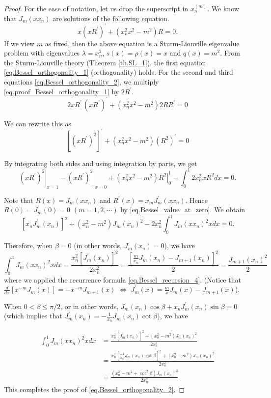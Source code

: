 \begin{proof} For the ease of notation, let us drop the superscript in $x_n^{(m)}$. We know that $J_m\left(x x_{n}\right)$ are solutions of the following equation. 
\begin{equation}\label{eq.proof_Bessel_orthogonality_1}
    x(x R^{\prime})^{\prime} + (x_n^2 x^2 - m^2) R = 0.
\end{equation}
If we view $m$ as fixed, then the above equation is a Sturm-Liouville eigenvalue problem with eigenvalues $\lambda=x_n^2$, $s(x) = \rho(x) = x$ and $q(x) = m^2$. From the Sturm-Liouville theory (Theorem \ref{th.SL_1}), the first equation \eqref{eq.Bessel_orthogonality_1} (orthogonality) holds. For the second and third equations \eqref{eq.Bessel_orthogonality_2}, we multiply \eqref{eq.proof_Bessel_orthogonality_1} by $2 R^{\prime}$.
$$
2 x R^{\prime}\, (x R^{\prime})^{\prime} +\left(x_n^2 x^2-m^2\right) 2 R R^{\prime}=0
$$

We can rewrite this as
$$
\left[\left(x R^{\prime}\right)^2\right]^{\prime}+\left(x_n^2 x^2-m^2\right)\left(R^2\right)^{\prime}=0
$$

By integrating both sides and using integration by parts, we get
$$
\left.\left(x R^{\prime}\right)^2\right|_{x=1}-\left.\left(x R^{\prime}\right)^2\right|_{x=0}+\left.\left(x_n^2 x^2-m^2\right) R^2\right|_0 ^1-\int_0^1 2 x_n^2 x R^2 d x=0 .
$$

Note that $R(x)=J_m\left(x x_n\right)$ and $R^{\prime}(x)=x_m J_m^{\prime}(x x_n)$. Hence $R(0)=J_m(0)=0$ $(m=1,2, \cdots)$ by \eqref{eq.Bessel_value_at_zero}. We obtain
$$
\left[x_n J_m^{\prime}(x_n)\right]^2+\left(x_n^2-m^2\right) J_m(x_n)^2-2 x_n^2 \int_0^1 J_m\left(x x_n\right)^2 x d x=0 .
$$


Therefore, when $\beta=0$ (in other words, $J_m(x_n)=0$), we have
$$
\int_0^1 J_m\left(x x_n\right)^2 x d x=\frac{x_n^2\left[J_m^{\prime}(x_n)\right]^2}{2 x_n^2}=\frac{\left[\frac{m}{x_n} J_m(x_n)-J_{m+1}(x_n)\right]^2}{2}=\frac{J_{m+1}(x_n)^2}{2}
$$
where we applied the recurrence formula \eqref{eq.Bessel_recursion_4}. (Notice that $\frac{d}{d x}\left[x^{-m} J_m(x)\right]=-x^{-m} J_{m+1}(x)$ $\Leftrightarrow$ $J_m^{\prime}(x) = \frac{m}{x} J_m(x)-J_{m+1}(x)$).

When $0<\beta \leq \pi / 2$, or in other words, $J_m(x_n) \cos \beta+x_n J_m^{\prime}(x_n)\sin \beta=0$ (which implies that $J_m^{\prime}(x_n) = -\frac{1}{x_n} J_m(x_n) \cot \beta$), we have

$$
\begin{aligned}
\int_0^1 J_m\left(x x_n\right)^2 x d x & =\frac{x_n^2\left[J_m^{\prime}(x_n)\right]^2+\left(x_n^2-m^2\right) J_m(x_n)^2}{2 x_n^2} 
\\
& =\frac{x_n^2\left[\frac{-1}{x_n} J_m(x_n) \cot \beta\right]^2+\left(x_n^2-m^2\right) J_m(x_n)^2}{2 x_n^2} 
\\
& =\frac{\left(x_n^2-m^2+\cot ^2 \beta\right) J_m(x_n)^2}{2 x_n^2}
\end{aligned}
$$
This completes the proof of \eqref{eq.Bessel_orthogonality_2}.
\end{proof}

